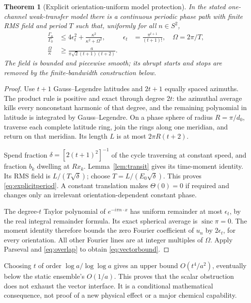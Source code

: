 \documentclass[11pt]{article}
\newtheorem{theorem}{Theorem}
\newcommand{\sinc}{\operatorname{sinc}}
\begin{document}
\begin{theorem}[Explicit orientation-uniform model protection]\label{thm:vector}
In the stated one-channel weak-transfer model there is a continuous periodic
phase path with finite RMS field and period $T$ such that, uniformly for
all $n\in S^2$,
\begin{align}
 \frac{\Gamma_n}{\Gamma_0}
 &\le4\epsilon_t^2+\frac{\kappa^2}{\kappa^2+\Omega^2},
 &\epsilon_t&=\frac{\pi^{t+1}}{(t+1)!},\quad\Omega=2\pi/T,\label{eq:vectorbound}\\
 \frac{\Omega}{\kappa}
 &\ge\frac{a}{\pi\sqrt2(t+1)(t+2)}.\label{eq:explicitperiod}
\end{align}
The field is bounded and piecewise smooth; its abrupt starts and stops are
removed by the finite-bandwidth construction below.
\end{theorem}
\begin{proof}
Use $t+1$ Gauss--Legendre latitudes and $2t+1$ equally spaced azimuths.
The product rule is positive and exact through degree $2t$: the azimuthal
average kills every nonconstant harmonic of that degree, and the remaining
polynomial in latitude is integrated by Gauss--Legendre.
On a phase sphere of radius $R=\pi/d_0$, traverse each complete latitude ring,
join the rings along one meridian, and return on that meridian. Its length
$L$ is at most $2\pi R(t+2)$.

Spend fraction $\delta=[2(t+1)^2]^{-1}$ of the cycle traversing at constant
speed, and fraction $b_k$ dwelling at $Rx_k$. Lemma~\ref{lem:transit} gives its
time-moment identity. Its RMS field is $L/(T\sqrt\delta)$; choose
$T=L/(E_0\sqrt\delta)$. This proves \eqref{eq:explicitperiod}.
A constant translation makes $\Theta(0)=0$ if required and changes only an
irrelevant orientation-dependent constant phase.

The degree-$t$ Taylor polynomial of $e^{-i\pi n\cdot x}$ has uniform
remainder at most $\epsilon_t$, by the real integral remainder formula.
Its exact spherical average is $\sinc\pi=0$.
The moment identity therefore bounds the zero Fourier coefficient of $u_n$
by $2\epsilon_t$, for every orientation. All other Fourier lines are at
integer multiples of $\Omega$. Apply Parseval and \eqref{eq:overlap} to obtain
\eqref{eq:vectorbound}.
\end{proof}

Choosing $t$ of order $\log a/\log\log a$ gives an upper bound
$O(t^4/a^2)$, eventually below the static ensemble's $O(1/a)$.
This proves that the scalar obstruction does not exhaust the vector
interface. It is a conditional mathematical consequence, not proof of a
new physical effect or a major chemical capability.
\end{document}
